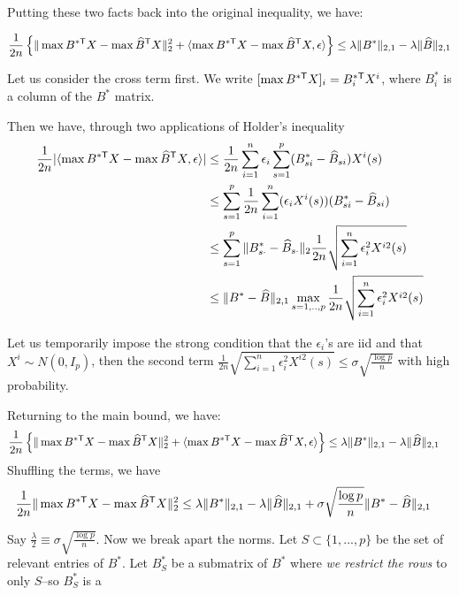 \documentclass{article}
\begin{document}
Putting these two facts back into the original inequality, we have:

\begin{align*}
\frac{1}{2n} \left\{ \| \max B^{* \mathsf{T}} X - \max \widehat{B}^{\mathsf{T}} X  \|_2^2 + 
\langle \max B^{* \mathsf{T}} X - \max \widehat{B}^{\mathsf{T}} X, \epsilon \rangle \right\} \leq \lambda \| B^* \|_{2,1} - \lambda \|\widehat{B}\|_{2,1}
\end{align*}

Let us consider the cross term first. We write $[\max B^{* \mathsf{T}} X]_i = B^{*\mathsf{T}}_i X^i$, where $B^*_i$ is a column of the $B^*$ matrix.

Then we have, through two applications of Holder's inequality
\begin{align*}
\frac{1}{2n} |\langle \max B^{* \mathsf{T}} X - \max \widehat{B}^{\mathsf{T}} X, \epsilon \rangle| 
				&\leq \frac{1}{2n} \sum_{i=1}^n \epsilon_i \sum_{s=1}^p (B^*_{si} - \widehat{B}_{si}) X^i(s) \\
				&\leq \sum_{s=1}^p \frac{1}{2n} \sum_{i=1}^n ( \epsilon_i X^i(s))(B^*_{si} - \widehat{B}_{si}) \\
				&\leq \sum_{s=1}^p \| B^*_{s \cdot} - \widehat{B}_{s \cdot} \|_2 \frac{1}{2n} \sqrt{\sum_{i=1}^n \epsilon^2_i X^{i 2}(s)} \\
				&\leq \| B^* - \widehat{B}\|_{2,1} \max_{s=1,..,p} \frac{1}{2n} \sqrt{\sum_{i=1}^n \epsilon^2_i X^{i 2}(s)} 
\end{align*}				

Let us temporarily impose the strong condition that the $\epsilon_i$'s are iid and that $X^i \sim N(0,I_p)$, then the second term $\frac{1}{2n} \sqrt{\sum_{i=1}^n \epsilon^2_i X^{i 2}(s)}  \leq \sigma \sqrt{\frac{\log p}{n}}$ with high probability.

Returning to the main bound, we have:
\begin{align*}
\frac{1}{2n} \left\{ \| \max B^{* \mathsf{T}} X - \max \widehat{B}^{\mathsf{T}} X  \|_2^2 + 
\langle \max B^{* \mathsf{T}} X - \max \widehat{B}^{\mathsf{T}} X, \epsilon \rangle \right\} &\leq \lambda \| B^* \|_{2,1} - \lambda \|\widehat{B}\|_{2,1} 
\end{align*}
Shuffling the terms, we have
\begin{align*}
\frac{1}{2n} \| \max B^{* \mathsf{T}} X - \max \widehat{B}^{\mathsf{T}} X  \|_2^2 &\leq \lambda \| B^* \|_{2,1} - \lambda \|\widehat{B}\|_{2,1}  + \sigma \sqrt{\frac{\log p}{n}} \| B^* - \widehat{B} \|_{2,1} 
\end{align*}

Say $\frac{\lambda}{2} \equiv \sigma \sqrt{\frac{\log p}{n}}$. Now we break apart the norms. Let $S \subset \{1,...,p\}$ be the set of relevant entries of $B^*$. Let $B^*_S$ be a submatrix of $B^*$ where \emph{we restrict the rows} to only $S$--so $B^*_S$ is a 
\end{document}
